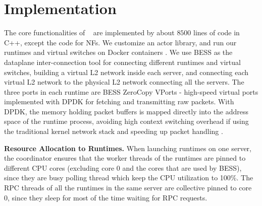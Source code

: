 \section{Implementation}
\label{sec:implementation}


The core functionalities of \nfactor~ are implemented by about $8500$ lines of code in C++, except the code for NFs. We customize an actor library, and run our runtimes and virtual switches on Docker containers \cite{docker}. We use BESS \cite{bess} as the dataplane inter-connection tool for connecting different runtimes and virtual switches, building a virtual L2 network inside each server, and connecting each virtual L2 network to the physical L2 network connecting all the servers. The three ports in each runtime are BESS ZeroCopy VPorts - high-speed virtual ports implemented with DPDK for fetching and transmitting raw packets. With DPDK, the memory holding packet buffers is mapped directly into the address space of the runtime process, %
avoiding high context switching overhead if using the traditional kernel network stack and speeding up packet handling \cite{martins2014clickos}. %

\vspace{1mm}
\noindent \textbf{Resource Allocation to Runtimes.} %
When launching runtimes on one server, the coordinator ensures that the worker threads of the runtimes are pinned to different CPU cores (excluding core 0 and the cores that are used by BESS), since they are busy polling thread which keep the CPU utilization to 100\%. The RPC threads of all the runtimes in the same server are collective pinned to core 0, since they sleep for most of the time waiting for RPC requests.  %

